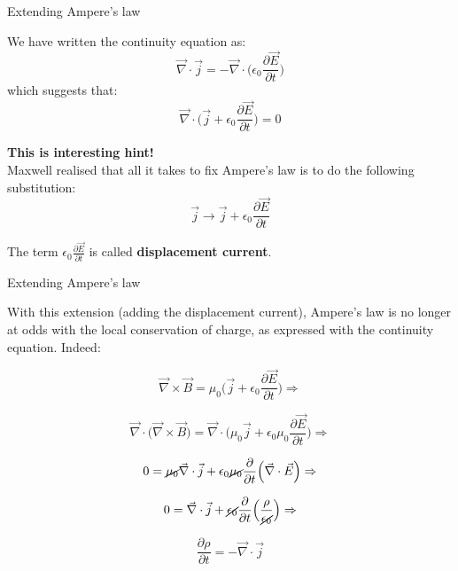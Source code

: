 %
%
%

\begin{frame}{Extending Ampere's law}

We have written the continuity equation as:
\begin{equation*}
  \vec{\nabla} \cdot \vec{j} = - \vec{\nabla} \cdot \Big( \epsilon_0 \frac{\partial \vec{E}}{\partial t} \Big)
\end{equation*}
which suggests that:
\begin{equation*}
  \vec{\nabla} \cdot \Big( \vec{j} + \epsilon_0 \frac{\partial \vec{E}}{\partial t} \Big) = 0
\end{equation*}

{\bf This is interesting hint!}\\
Maxwell realised that all it takes to fix Ampere's law is to do the following substitution:
\begin{equation*}
  \vec{j} \rightarrow
  \vec{j} + \epsilon_0 \frac{\partial \vec{E}}{\partial t}
\end{equation*}

The term $\displaystyle \epsilon_0 \frac{\partial \vec{E}}{\partial t}$ is called {\bf displacement current}.
\end{frame}

%
%
%

\begin{frame}{Extending Ampere's law}

With this extension (adding the displacement current), Ampere's law is no longer at odds with the
local conservation of charge, as expressed with the continuity equation. Indeed:

\begin{equation*}
  \vec{\nabla} \times \vec{B} =
      \mu_0 \Big( \vec{j} + \epsilon_0 \frac{\partial \vec{E}}{\partial t} \Big)  \Rightarrow
\end{equation*}

\begin{equation*}
  \vec{\nabla} \cdot \Big( \vec{\nabla} \times \vec{B} \Big) =
    \vec{\nabla} \cdot \Big( \mu_0 \vec{j} + \epsilon_0 \mu_0 \frac{\partial \vec{E}}{\partial t} \Big)  \Rightarrow
\end{equation*}

\begin{equation*}
  0 =
    \cancel{\mu_0} \vec{\nabla} \cdot \vec{j} + \epsilon_0 \cancel{\mu_0} \frac{\partial}{\partial t}
    \Big( \vec{\nabla} \cdot  \vec{E}\Big)  \Rightarrow
\end{equation*}

\begin{equation*}
  0 =
    \vec{\nabla} \cdot \vec{j} + \cancel{\epsilon_0} \frac{\partial}{\partial t}
      \Big( \frac{\rho}{\cancel{\epsilon_0}} \Big)  \Rightarrow
\end{equation*}

\begin{equation*}
    \frac{\partial \rho}{\partial t} = - \vec{\nabla} \cdot \vec{j}
\end{equation*}

\end{frame}


